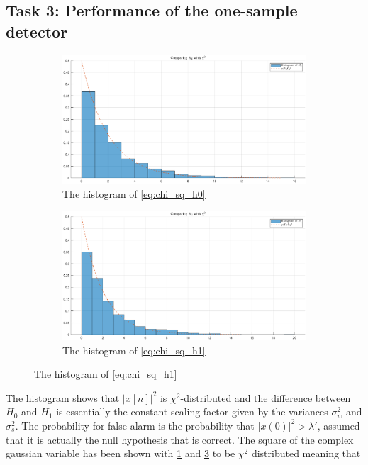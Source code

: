 \subsection{Task 3: Performance of the one-sample detector}
\begin{figure}[ht]
    \begin{subfigure}{.5\textwidth}
        \centering
        \includegraphics[width=.8\linewidth]{figures/chi_square_h0.eps}  
        \caption{The histogram of \eqref{eq:chi_sq_h0}}
        \label{fig:chi_sq_h0}
    \end{subfigure}
    \begin{subfigure}{.5\textwidth}
        \centering
        \includegraphics[width=.8\linewidth]{figures/chi_square_h1.eps}  
        \caption{The histogram of \eqref{eq:chi_sq_h1}}
        \label{fig:chi_sq_h1}
    \end{subfigure}
\end{figure}
The histogram shows that $|x[n]|^2$ is $\chi^2$-distributed and the difference between $H_0$ and $H_1$ is essentially the constant scaling factor given by the variances $\sigma_w^2$ and $\sigma_s^2$.
The probability for false alarm is the probability that $|x(0)|^2>\lambda'$, assumed that it is actually the null hypothesis that is correct. The square of the complex gaussian variable has been shown with \ref{fig:chi_sq_h0} and \ref{fig:chi_sq_h1} to be $\chi^2$ distributed meaning that
